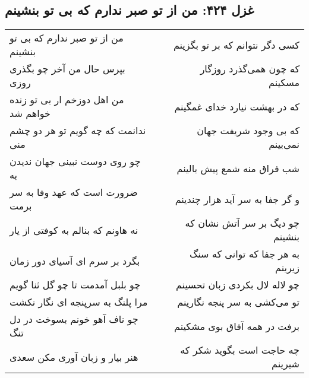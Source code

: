 \begin{center}
\section*{غزل ۴۲۴: من از تو صبر ندارم که بی تو بنشینم}
\label{sec:424}
\begin{longtable}{l p{0.5cm} r}
من از تو صبر ندارم که بی تو بنشینم
&&
کسی دگر نتوانم که بر تو بگزینم
\\
بپرس حال من آخر چو بگذری روزی
&&
که چون همی‌گذرد روزگار مسکینم
\\
من اهل دوزخم ار بی تو زنده خواهم شد
&&
که در بهشت نیارد خدای غمگینم
\\
ندانمت که چه گویم تو هر دو چشم منی
&&
که بی وجود شریفت جهان نمی‌بینم
\\
چو روی دوست نبینی جهان ندیدن به
&&
شب فراق منه شمع پیش بالینم
\\
ضرورت است که عهد وفا به سر برمت
&&
و گر جفا به سر آید هزار چندینم
\\
نه هاونم که بنالم به کوفتی از یار
&&
چو دیگ بر سر آتش نشان که بنشینم
\\
بگرد بر سرم ای آسیای دور زمان
&&
به هر جفا که توانی که سنگ زیرینم
\\
چو بلبل آمدمت تا چو گل ثنا گویم
&&
چو لاله لال بکردی زبان تحسینم
\\
مرا پلنگ به سرپنجه ای نگار نکشت
&&
تو می‌کشی به سر پنجه نگارینم
\\
چو ناف آهو خونم بسوخت در دل تنگ
&&
برفت در همه آفاق بوی مشکینم
\\
هنر بیار و زبان آوری مکن سعدی
&&
چه حاجت است بگوید شکر که شیرینم
\\
\end{longtable}
\end{center}
